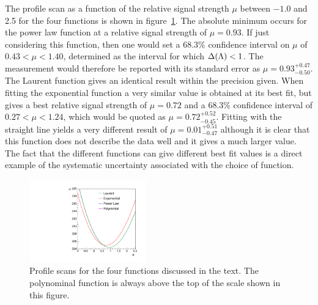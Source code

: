 The profile scan as a function of the relative signal strength $\mu$
between $-1.0$ and 2.5
for the four functions is shown in
figure~\ref{fig:functions:profiles}.
The absolute minimum occurs for the power law function at a relative signal 
strength of $\mu = 0.93$. If just considering this function,
then one would set a 68.3\% confidence interval on $\mu$ of  
$0.43 < \mu < 1.40 $, determined as the interval for which $\Delta({\rm \Lambda}) < 1$. 
The measurement would therefore be reported with its standard error as $\mu=0.93^{+0.47}_{-0.50}$. The Laurent function gives an identical result within the precision given.
When fitting the exponential function a very similar \nll value is obtained
at its best fit, but gives a best relative signal strength of $\mu = 0.72$
and a 68.3\% confidence interval of
$0.27 < \mu < 1.24 $, which would be quoted as $\mu = 0.72^{+0.52}_{-0.45}$.
Fitting with the straight line yields a very different result of 
$\mu = 0.01^{+0.51}_{-0.47}$ 
although it is clear that this function does not describe the data well and it
gives a much larger \nll value.
The fact that the different functions can give different best fit values
is a direct example of the systematic uncertainty associated
with the choice of function.
%
\begin{figure}[tbp]
\centering
\includegraphics[width=0.45\textwidth]{functions/Profiles.pdf}
\caption{Profile \nll scans for the four functions discussed in the text.
The polynominal function is always above the top of the \nll scale shown in this
figure. }
\label{fig:functions:profiles}
\end{figure}

